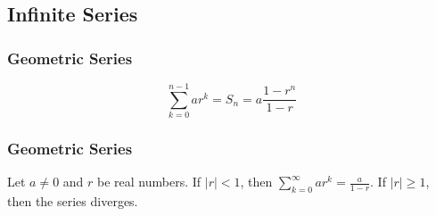 \subsection{Infinite Series}
\subsubsection{Geometric Series}
\begin{equation}
    \sum _{k = 0} ^{n - 1} ar^k = S_n = a \frac{1- r^n}{1 - r}
\end{equation}

\subsubsection{Geometric Series}
Let $a \neq 0$ and $r$ be real numbers. If $|r| < 1$, then $\sum _{k = 0} ^{\infty} ar^k = \frac{a}{1 - r}$. If $|r| \geq 1$, then the series diverges.

